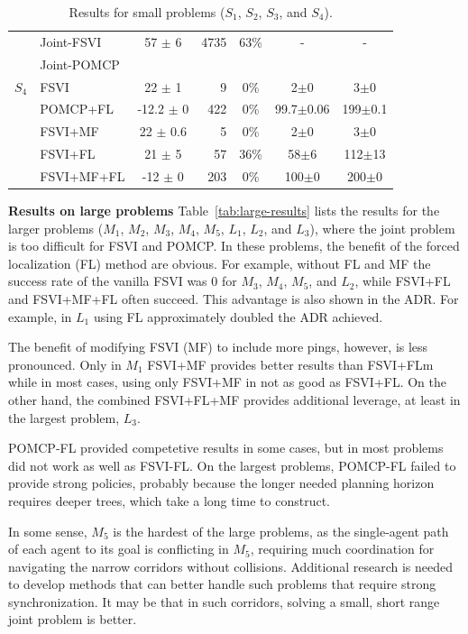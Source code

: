 \documentclass[letterpaper]{article} %
\newcommand{\itay}[1]{}
\begin{document}
\begin{table}
{\begin{tabular}{ |c|l|c|r|c|c|c| }
    \hline
    \hline
    \multirow{5}{*}{$S_4$}
    & Joint-FSVI\itay{+} & 57 $\pm$ 6 & 4735 & 63\% &  - & - \\
    & Joint-POMCP &&&&& \\
    & FSVI\itay{+} & 22 $\pm$ 1 & 9 & 0\% & 2$\pm$0 & 3$\pm$0 \\
    & POMCP+FL\itay{+} & -12.2 $\pm$ 0 & 422 & 0\% & 99.7$\pm$0.06 & 199$\pm$0.1 \\
    & FSVI+MF\itay{+} & 22 $\pm$ 0.6 & 5 & 0\% &  2$\pm$0 & 3$\pm$0 \\
    &FSVI+FL\itay{+} & 21 $\pm$ 5 & 57 & 36\% & 58$\pm$6 & 112$\pm$13 \\
    & FSVI+MF+FL\itay{+} & -12 $\pm$ 0 & 203 & 0\% &  100$\pm$0 & 200$\pm$0 \\
    \hline
    \hline
     \end{tabular}
     }
    \caption{Results for small problems ($S_1$, $S_2$, $S_3$, and $S_4$).\itay{** Average run-time in 200 runs}}
    \label{tab:2small-results}
\end{table}




\noindent\textbf{Results on large problems}
Table~\ref{tab:large-results} lists the results for the larger problems ($M_1$, $M_2$, $M_3$, $M_4$, $M_5$, $L_1$, $L_2$, and $L_3$), where the joint problem is too difficult for FSVI and POMCP.
In these problems, the benefit of the forced localization (FL) method are obvious.
For example, without FL and MF the success rate of the vanilla FSVI was 0 for $M_3$, $M_4$, $M_5$, and $L_2$, while
FSVI+FL and FSVI+MF+FL often succeed. This advantage is also shown in the ADR.
For example, in $L_1$ using FL approximately doubled the ADR achieved.


The benefit of modifying FSVI (MF) to include more pings, however, is less pronounced. Only in $M_1$ FSVI+MF provides better results than FSVI+FLm while in most cases, using only FSVI+MF in not as good as FSVI+FL. On the other hand, the combined FSVI+FL+MF provides additional leverage, at least in the largest problem, $L_3$.

POMCP-FL provided competetive results in some cases, but in most problems did not work as well as FSVI-FL. On the largest problems, POMCP-FL failed to provide strong policies, probably because the longer needed planning horizon requires deeper trees, which take a long time to construct.

In some sense, $M_5$ is the hardest of the large problems, as the single-agent path of each agent to its goal is conflicting in $M_5$, requiring much coordination for navigating the narrow corridors without collisions.
Additional research is needed to develop methods that can better handle such problems that require strong synchronization. It may be that in such corridors, solving a small, short range joint problem is better.
\end{document}
